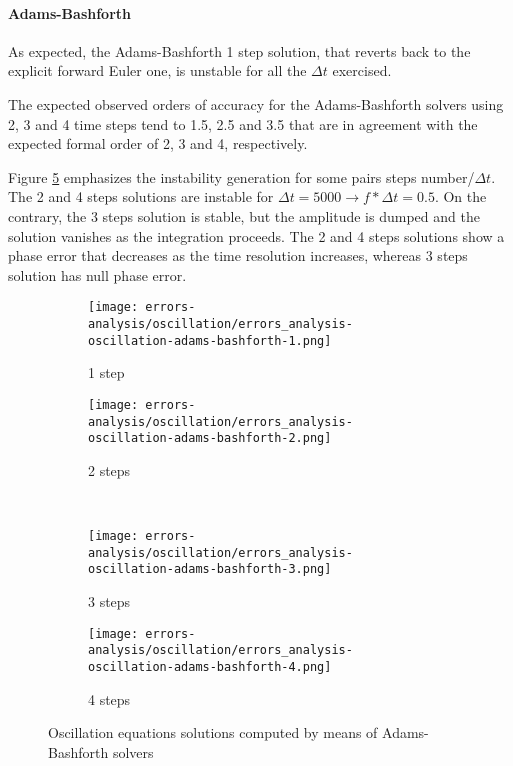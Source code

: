 \documentclass[pdftex,preprint,3p,times,numbers]{elsarticle}
\begin{document}
\paragraph{Adams-Bashforth}

As expected, the Adams-Bashforth 1 step solution, that reverts back to the explicit forward Euler one, is unstable for all the $\Delta t$ exercised.

The expected observed orders of accuracy for the Adams-Bashforth solvers using 2, 3 and 4 time steps tend to 1.5, 2.5 and 3.5 that are in agreement with the expected formal order of 2, 3 and 4, respectively.

Figure \ref{fig:results-oscillation-adams-bashforth} emphasizes the instability generation for some pairs steps number/$\Delta t$. The 2 and 4 steps solutions are instable for $\Delta t=5000 \rightarrow f*\Delta t=0.5$. On the contrary, the 3 steps solution is stable, but the amplitude is dumped and the solution vanishes as the integration proceeds. The 2 and 4 steps solutions show a phase error that decreases as the time resolution increases, whereas 3 steps solution has null phase error.

\begin{figure}[!ht]
  \centering
  \begin{subfigure}[b]{0.45\textwidth}
    \centering
    \texttt{[image: errors-analysis/oscillation/errors\_analysis-oscillation-adams-bashforth-1.png]}
    \caption{1 step}\label{fig:results-oscillation-adams-bashforth-1}
  \end{subfigure}\quad%
  \begin{subfigure}[b]{0.45\textwidth}
    \centering
    \texttt{[image: errors-analysis/oscillation/errors\_analysis-oscillation-adams-bashforth-2.png]}
    \caption{2 steps}\label{fig:results-oscillation-adams-bashforth-2}
  \end{subfigure}\\
  \begin{subfigure}[b]{0.45\textwidth}
    \centering
    \texttt{[image: errors-analysis/oscillation/errors\_analysis-oscillation-adams-bashforth-3.png]}
    \caption{3 steps}\label{fig:results-oscillation-adams-bashforth-3}
  \end{subfigure}\quad%
  \begin{subfigure}[b]{0.45\textwidth}
    \centering
    \texttt{[image: errors-analysis/oscillation/errors\_analysis-oscillation-adams-bashforth-4.png]}
    \caption{4 steps}\label{fig:results-oscillation-adams-bashforth-4}
  \end{subfigure}
  \caption{Oscillation equations solutions computed by means of Adams-Bashforth solvers}\label{fig:results-oscillation-adams-bashforth}
\end{figure}
\end{document}
